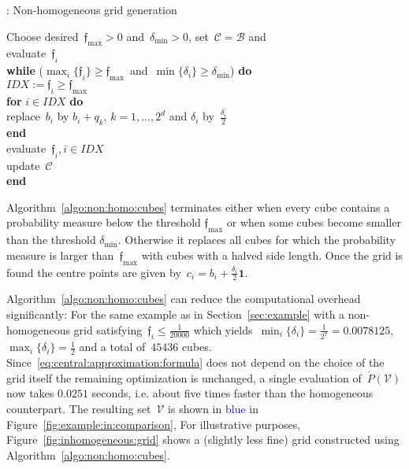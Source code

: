 \documentclass[letterpaper, 10pt, conference]{ieeeconf} %
\providecommand{\bfa}[1]{\mathbf{#1}}
\begin{document}
\begin{algorithm}[h]
\caption{: Non-homogeneous grid generation \label{algo:non:homo:cubes}}
Choose desired~$\mathfrak{f}_{\max}>0$ and~$\delta_{\min}>0$,
set~$\mathcal C=\mathcal B$ and \\
evaluate~$\mathfrak{f}_i$\\
\textbf{while}
($\max_i\{\mathfrak{f}_i\}\geq\mathfrak{f}_{\max}$~and~$\min\{\delta_i\}\geq\delta_{\min}$) \textbf{do}\\
\mbox{}\quad$IDX := \mathfrak{f}_i\geq \mathfrak{f}_{\max}$\\
\mbox{}\quad\textbf{for} $i\in IDX$ \textbf{do} \\
\mbox{}\quad\quad replace~$b_i$ by $b_i+q_k$, $k=1,\dots,2^d$ 
and $\delta_i$ by~$\frac{\delta_i}{2}$ \\
\mbox{}\quad\textbf{end}\\
\mbox{}\quad evaluate~$\mathfrak f_i, i\in IDX$ \\
\quad update~$\mathcal C$ \\
\textbf{end}
\end{algorithm}
%

Algorithm~\ref{algo:non:homo:cubes} terminates either when every cube contains a probability measure below the threshold $\mathfrak{f}_{\max}$ or when some cubes become smaller than the threshold $\delta_{\min}$. Otherwise it replaces all cubes for which the probability measure is larger than~$\mathfrak{f}_{\max}$ with cubes with a halved side length.
%
Once the grid is found the centre points are given by~$c_i=b_i+\frac{\delta_i}{2}\bfa{1}$.
%


%
Algorithm~\ref{algo:non:homo:cubes} can reduce the computational overhead significantly:
%
For the same example as in Section~\ref{sec:example} with a non-homogeneous grid satisfying~$\mathfrak{f}_i\leq\frac{1}{20000}$ which yields~$\min_i\{\delta_i\}=\frac{1}{2^7}=0.0078125$,~$\max_i\{\delta_i\}=\frac{1}{2}$ and a total of~$45436$ cubes.
%
Since~\eqref{eq:central:approximation:formula} does not depend on the choice of the grid itself the remaining optimization is unchanged, a single evaluation of~$\mathring{P}(\mathcal V)$ now takes $0.0251$ seconds,
i.e. about five times  faster than the homogeneous counterpart. The resulting set~$\mathcal V$ is shown in \textcolor{blue}{blue} in Figure~\ref{fig:example:in:comparison},
%
For illustrative purposes, Figure~\ref{fig:inhomogeneous:grid} shows a (slightly less fine) grid constructed using Algorithm~\ref{algo:non:homo:cubes}.
\end{document}
